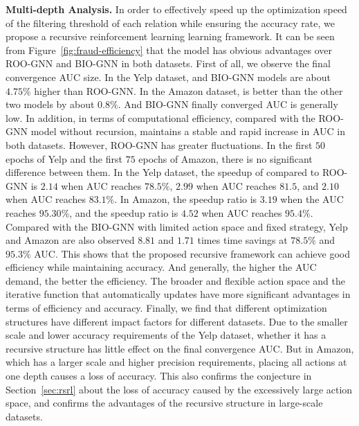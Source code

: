 \textbf{Multi-depth Analysis.}
In order to effectively speed up the optimization speed of the filtering threshold of each relation while ensuring the accuracy rate, we propose a recursive reinforcement learning learning framework. 
It can be seen from Figure~\ref{fig:fraud-efficiency} that the \RioGNN model has obvious advantages over ROO-GNN and BIO-GNN in both datasets. 
First of all, we observe the final convergence AUC size.
In the Yelp dataset, \RioGNN and BIO-GNN models are about $4.75\%$ higher than ROO-GNN. 
In the Amazon dataset, \RioGNN is better than the other two models by about $0.8\%$. 
And BIO-GNN finally converged AUC is generally low. 
In addition, in terms of computational efficiency, compared with the ROO-GNN model without recursion, \RioGNN maintains a stable and rapid increase in AUC in both datasets. 
However, ROO-GNN has greater fluctuations. 
In the first $50$ epochs of Yelp and the first $75$ epochs of Amazon, there is no significant difference between them. 
In the Yelp dataset, the speedup of \RioGNN compared to ROO-GNN is $2.14$ when AUC reaches $78.5\%$, $2.99$ when AUC reaches $81.5$, and $2.10$ when AUC reaches $83.1\%$. 
In Amazon, the speedup ratio is $3.19$ when the AUC reaches $95.30\%$, and the speedup ratio is $4.52$ when AUC reaches $95.4\%$. 
Compared with the BIO-GNN with limited action space and fixed strategy, Yelp and Amazon are also observed $8.81$ and $1.71$ times time savings at $78.5\%$ and $95.3\%$ AUC. 
This shows that the proposed recursive framework can achieve good efficiency while maintaining accuracy. And generally, the higher the AUC demand, the better the efficiency. 
The broader and flexible action space and the iterative function that automatically updates have more significant advantages in terms of efficiency and accuracy. 
Finally, we find that different optimization structures have different impact factors for different datasets. 
Due to the smaller scale and lower accuracy requirements of the Yelp dataset, whether it has a recursive structure has little effect on the final convergence AUC. 
But in Amazon, which has a larger scale and higher precision requirements, placing all actions at one depth causes a loss of accuracy. 
This also confirms the conjecture in Section~\ref{sec:rsrl} about the loss of accuracy caused by the excessively large action space, and confirms the advantages of the recursive structure in large-scale datasets.







